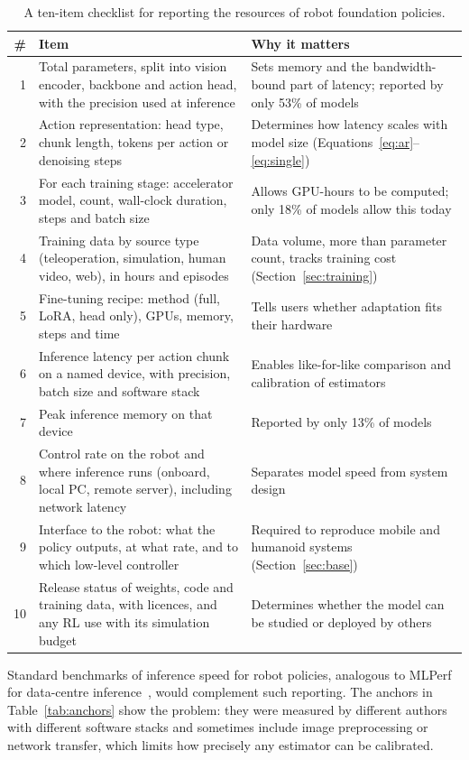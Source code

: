 \documentclass[applsci,review,submit,pdftex,oneauthor]{Definitions/mdpi}
\begin{document}
\begin{table}[H]
\caption{A ten-item checklist for reporting the resources of robot foundation policies.\label{tab:checklist}}
\small
\begin{tabularx}{\textwidth}{@{}r X X@{}}
\toprule
\textbf{\#} & \textbf{Item} & \textbf{Why it matters}\\
\midrule
1 & Total parameters, split into vision encoder, backbone and action head, with the precision used at inference & Sets memory and the bandwidth-bound part of latency; reported by only 53\% of models\\
2 & Action representation: head type, chunk length, tokens per action or denoising steps & Determines how latency scales with model size (Equations~\eqref{eq:ar}--\eqref{eq:single})\\
3 & For each training stage: accelerator model, count, wall-clock duration, steps and batch size & Allows GPU-hours to be computed; only 18\% of models allow this today\\
4 & Training data by source type (teleoperation, simulation, human video, web), in hours and episodes & Data volume, more than parameter count, tracks training cost (Section~\ref{sec:training})\\
5 & Fine-tuning recipe: method (full, LoRA, head only), GPUs, memory, steps and time & Tells users whether adaptation fits their hardware\\
6 & Inference latency per action chunk on a named device, with precision, batch size and software stack & Enables like-for-like comparison and calibration of estimators\\
7 & Peak inference memory on that device & Reported by only 13\% of models\\
8 & Control rate on the robot and where inference runs (onboard, local PC, remote server), including network latency & Separates model speed from system design\\
9 & Interface to the robot: what the policy outputs, at what rate, and to which low-level controller & Required to reproduce mobile and humanoid systems (Section~\ref{sec:base})\\
10 & Release status of weights, code and training data, with licences, and any RL use with its simulation budget & Determines whether the model can be studied or deployed by others\\
\bottomrule
\end{tabularx}
\end{table}

Standard benchmarks of inference speed for robot policies, analogous to MLPerf for data-centre inference~\cite{reddi2020mlperf}, would complement such reporting. The anchors in Table~\ref{tab:anchors} show the problem: they were measured by different authors with different software stacks and sometimes include image preprocessing or network transfer, which limits how precisely any estimator can be calibrated.
\end{document}
